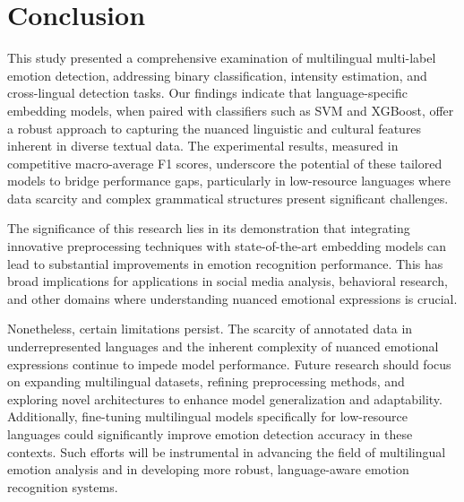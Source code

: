 \section{Conclusion}
This study presented a comprehensive examination of multilingual multi-label emotion detection, addressing binary classification, intensity estimation, and cross-lingual detection tasks. Our findings indicate that language-specific embedding models, when paired with classifiers such as SVM and XGBoost, offer a robust approach to capturing the nuanced linguistic and cultural features inherent in diverse textual data. The experimental results, measured in competitive macro-average F1 scores, underscore the potential of these tailored models to bridge performance gaps, particularly in low-resource languages where data scarcity and complex grammatical structures present significant challenges.

The significance of this research lies in its demonstration that integrating innovative preprocessing techniques with state-of-the-art embedding models can lead to substantial improvements in emotion recognition performance. This has broad implications for applications in social media analysis, behavioral research, and other domains where understanding nuanced emotional expressions is crucial.

Nonetheless, certain limitations persist. The scarcity of annotated data in underrepresented languages and the inherent complexity of nuanced emotional expressions continue to impede model performance. Future research should focus on expanding multilingual datasets, refining preprocessing methods, and exploring novel architectures to enhance model generalization and adaptability. Additionally, fine-tuning multilingual models specifically for low-resource languages could significantly improve emotion detection accuracy in these contexts. Such efforts will be instrumental in advancing the field of multilingual emotion analysis and in developing more robust, language-aware emotion recognition systems.


